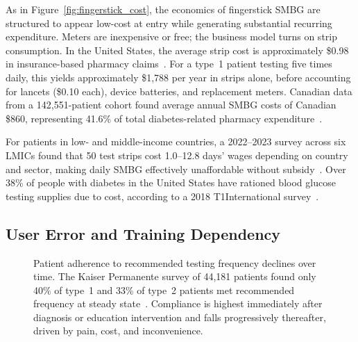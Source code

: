 As in Figure~\ref{fig:fingerstick_cost}, the economics of fingerstick SMBG are structured to appear low-cost at entry while generating substantial recurring expenditure. Meters are inexpensive or free; the business model turns on strip consumption. In the United States, the average strip cost is approximately \$0.98 in insurance-based pharmacy claims~\cite{yeaw2012}. For a type~1 patient testing five times daily, this yields approximately \$1,788 per year in strips alone, before accounting for lancets (\$0.10 each), device batteries, and replacement meters. Canadian data from a 142,551-patient cohort found average annual SMBG costs of Canadian \$860, representing 41.6\% of total diabetes-related pharmacy expenditure~\cite{yeawcanada2012}.

For patients in low- and middle-income countries, a 2022--2023 survey across six LMICs found that 50 test strips cost 1.0--12.8 days' wages depending on country and sector, making daily SMBG effectively unaffordable without subsidy~\cite{lmic2025}. Over 38\% of people with diabetes in the United States have rationed blood glucose testing supplies due to cost, according to a 2018 T1International survey~\cite{healthline2022}.

\subsection*{User Error and Training Dependency}

\begin{figure}[H]
\centering
{}
\caption{Patient adherence to recommended testing frequency declines over time. The Kaiser Permanente survey of 44,181 patients found only 40\% of type~1 and 33\% of type~2 patients met recommended frequency at steady state~\cite{lancing_pmid}. Compliance is highest immediately after diagnosis or education intervention and falls progressively thereafter, driven by pain, cost, and inconvenience.}
\label{fig:fingerstick_adherence}
\end{figure}

